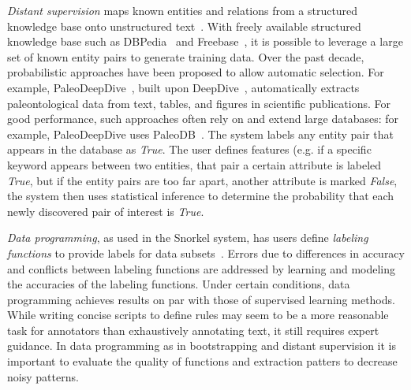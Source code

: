 \textit{Distant supervision} maps known entities and relations from a structured knowledge 
base onto unstructured text~\cite{peters2014machine,de2016deepdive}. 
With freely available structured knowledge base such as DBPedia~\cite{auer2007dbpedia} and Freebase~\cite{bollacker2008freebase}, it is possible to leverage a large set of known entity pairs to generate training data.
Over the past decade, probabilistic approaches have been proposed to allow automatic selection.
For example, PaleoDeepDive~\cite{peters2014machine}, built upon DeepDive~\cite{de2016deepdive}, automatically extracts
paleontological data from text, tables, and figures in scientific publications. 
For good performance, such approaches often rely on and extend large databases: for example,
PaleoDeepDive uses PaleoDB~\cite{PaleoDB}. 
The system labels any entity pair that appears in the database as \textit{True}.
The user defines features (e.g. if a specific keyword appears between two entities, that pair a certain attribute is labeled \textit{True}, but if the entity pairs are too far apart, another attribute is marked \textit{False}, 
the system then uses statistical inference to determine the probability that each newly discovered pair of interest is \textit{True}.

\textit{Data programming}, as used in the Snorkel system, has users define 
\textit{labeling functions} to provide labels for data subsets~\cite{ratner2016data}. 
Errors due to differences in accuracy and conflicts between labeling functions are 
addressed by learning and modeling the accuracies of the labeling functions. 
Under certain conditions, data programming achieves results on par with those of supervised learning methods.
While writing concise scripts to define rules may seem to be a more reasonable task for annotators 
than exhaustively annotating text, it still requires expert guidance.  
In data programming as in bootstrapping and distant supervision it is important to evaluate the quality of functions and extraction patters to decrease noisy patterns.

